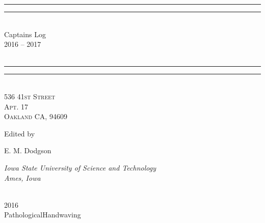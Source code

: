 \newcommand*{\titleGP}{\begingroup %
\centering %
\vspace*{\baselineskip} %

\rule{\textwidth}{1.6pt}\vspace*{-\baselineskip}\vspace*{2pt} %
\rule{\textwidth}{0.4pt}\\[\baselineskip] %

{\LARGE Captains Log\\ 2016 -- 2017 \\[0.3\baselineskip] }\\[0.2\baselineskip] %

\rule{\textwidth}{0.4pt}\vspace*{-\baselineskip}\vspace{3.2pt} %
\rule{\textwidth}{1.6pt}\\[\baselineskip] %

\scshape %
536 41st Street \\ %
Apt. 17 \\[\baselineskip] %
Oakland CA, 94609\par %

\vspace*{2\baselineskip} %

Edited by \\[\baselineskip]
{\Large E. M. Dodgson \\ \par} %
{\itshape Iowa State University of Science and Technology \\ Ames, Iowa \par} %

\vfill %

\plogo \\[0.3\baselineskip] %
{\scshape 2016} \\[0.3\baselineskip] %
{\large PathologicalHandwaving}\par %

\endgroup}


 

\pagestyle{empty} %

\titleGP %


